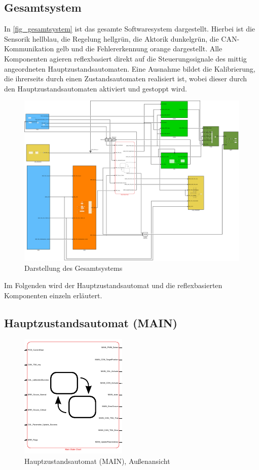 \subsection{Gesamtsystem}
In \autoref{fig_gesamtsystem} ist das gesamte Softwaresystem dargestellt. Hierbei ist die Sensorik hellblau, die Regelung hellgrün, die Aktorik dunkelgrün, die CAN-Kommunikation gelb und die Fehlererkennung orange dargestellt. Alle Komponenten agieren reflexbasiert direkt auf die Steuerungssignale des mittig angeordneten Hauptzustandsautomaten. Eine Ausnahme bildet die Kalibrierung, die ihrerseits durch einen Zustandsautomaten realisiert ist, wobei dieser durch den Hauptzustandsautomaten aktiviert und gestoppt wird. 
\begin{figure}[H]%
\centering
\includegraphics[width=0.9\columnwidth]{./Bilder/fig_gesamtsystem}%
\caption{Darstellung des Gesamtsystems}%
\label{fig_gesamtsystem}%
\end{figure}
Im Folgenden wird der Hauptzustandsautomat und die reflexbasierten Komponenten einzeln erläutert.

\subsection{Hauptzustandsautomat (MAIN)}

\begin{figure}[H]%
\centering
\includegraphics[width=0.4\columnwidth]{./Bilder/fig_main}%
\caption{Hauptzustandsautomat (MAIN), Außenansicht}%
\label{fig_main}%
\end{figure}

